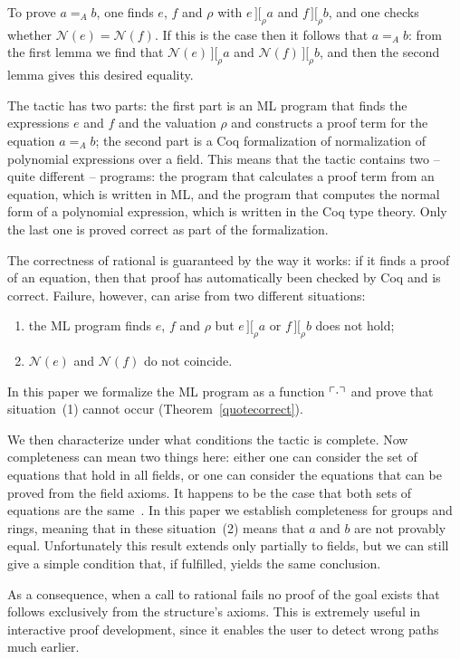 \documentclass[numreferences]{kluwer}
\newcommand{\intII}{\,]\![}
\newcommand{\intrel}{\mathbin{\intII_{\rho}}}
\newcommand{\N}{\ensuremath{\mathcal{N}}}
\newcommand{\tacticname}[1]{\textsf{#1}}
\newcommand{\rational}{\tacticname{rational}}
\newcommand{\mlfn}[2]{\ensuremath\ulcorner{#1}\urcorner_{#2}}
\begin{document}
\begin{article}
To prove $a =_A b$, one finds $e$, $f$ and $\rho$ with $e \intrel a$ and
$f \intrel b$,
and one checks whether $\N(e) = \N(f)$.
If this is the case then it follows that $a =_A b$:
from the first lemma we find that $\N(e) \intrel a$ and $\N(f) \intrel b$,
and then the second lemma gives this desired equality.

The tactic has two parts: the first part is an ML program that
finds the expressions $e$ and $f$ and the valuation $\rho$ and
constructs a proof term for the equation $a=_A b$; the second part is a
Coq formalization of normalization of polynomial expressions over a
field.
This means that the tactic contains two -- quite different --
programs: the program that calculates a proof term
from an equation, which is written in ML, and the program that computes the
normal form of a polynomial expression, which
is written in the Coq type theory.  Only the last one is proved correct
as part of the formalization.

The correctness of {\rational} is guaranteed by the way
it works: if it finds a proof of an equation, then that proof has
automatically been checked by Coq and is correct.
Failure, however, can arise from two different situations:
\begin{enumerate}[(1)]
\item the ML program finds $e$, $f$ and $\rho$ but $e\intrel a$ or
$f\intrel b$ does not hold;
\item $\N(e)$ and $\N(f)$ do not coincide.
\end{enumerate}
In this paper we formalize the ML program as a function $\mlfn{\cdot}{}$
and prove that situation~(1) cannot occur (Theorem~\ref{quotecorrect}).

We then characterize under what conditions the tactic is complete.
Now completeness can mean two things here:
either one can consider the set of equations that hold in all fields,
or one can consider the equations that can be proved from the field axioms.
It happens to be the case that both sets of equations are the
same~\cite{cha:key:90}.
In this paper we establish completeness for groups and rings,
meaning that in these situation~(2) means that $a$ and $b$ are not
provably equal.  Unfortunately this result extends only
partially to fields, but we can still give a simple condition that,
if fulfilled, yields the same conclusion.

As a consequence, when a call to {\rational} fails no proof of the goal
exists that follows exclusively from the structure's axioms.  This is
extremely useful in interactive proof development, since it enables the
user to detect wrong paths much earlier.


\end{article}
\end{document}
